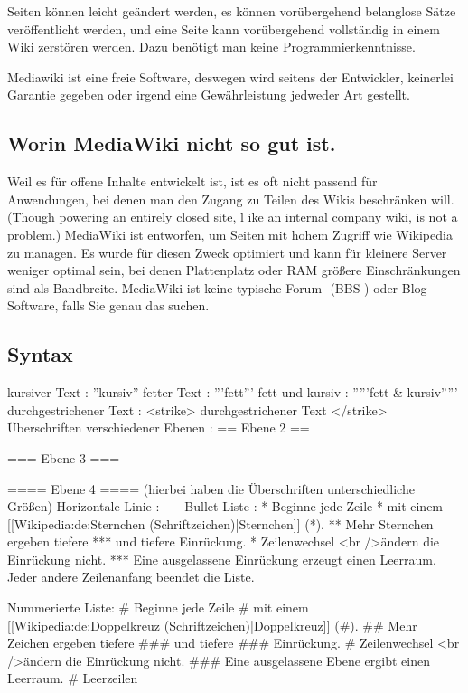 Seiten können leicht geändert werden, es können vorübergehend belanglose Sätze veröffentlicht werden, und eine Seite kann vorübergehend vollständig in einem Wiki zerstören werden. Dazu benötigt man keine Programmierkenntnisse.

Mediawiki ist eine freie Software, deswegen wird seitens der Entwickler, keinerlei Garantie gegeben oder irgend eine Gewährleistung jedweder Art gestellt.


\subsection{Worin MediaWiki nicht so gut ist.}
Weil es für offene Inhalte entwickelt ist, ist es oft nicht passend für Anwendungen, bei denen man den Zugang zu Teilen des Wikis beschränken will. (Though powering an entirely closed site, l	ike an internal company wiki, is not a problem.) 
MediaWiki ist entworfen, um Seiten mit hohem Zugriff wie Wikipedia zu managen. Es wurde für diesen Zweck optimiert und kann für kleinere Server weniger optimal sein, bei denen Plattenplatz oder RAM größere Einschränkungen sind als Bandbreite. 
MediaWiki ist keine typische Forum- (BBS-) oder Blog-Software, falls Sie genau das suchen. 

\subsection{Syntax}
kursiver Text : ''kursiv''
fetter Text : '''fett'''
fett und kursiv : '''''fett & kursiv'''''
durchgestrichener Text : <strike> durchgestrichener Text </strike>
Überschriften verschiedener Ebenen : == Ebene 2 ==

                                     === Ebene 3 ===

                                    ==== Ebene 4 ====  (hierbei haben die Überschriften unterschiedliche Größen)
Horizontale Linie :  ----
Bullet-Liste : 
                * Beginne jede Zeile
                * mit einem [[Wikipedia:de:Sternchen (Schriftzeichen)|Sternchen]] (*).
                ** Mehr Sternchen ergeben tiefere
                *** und tiefere Einrückung.
                * Zeilenwechsel <br />ändern die Einrückung nicht.
                *** Eine ausgelassene Einrückung erzeugt einen Leerraum.
                Jeder andere Zeilenanfang beendet die Liste.

Nummerierte Liste: 
                    # Beginne jede Zeile
                    # mit einem [[Wikipedia:de:Doppelkreuz (Schriftzeichen)|Doppelkreuz]] (#).
                    ## Mehr Zeichen ergeben tiefere
                    ### und tiefere
                    ### Einrückung.
                    # Zeilenwechsel <br />ändern die Einrückung nicht.
                    ### Eine ausgelassene Ebene ergibt einen Leerraum.
                    # Leerzeilen

